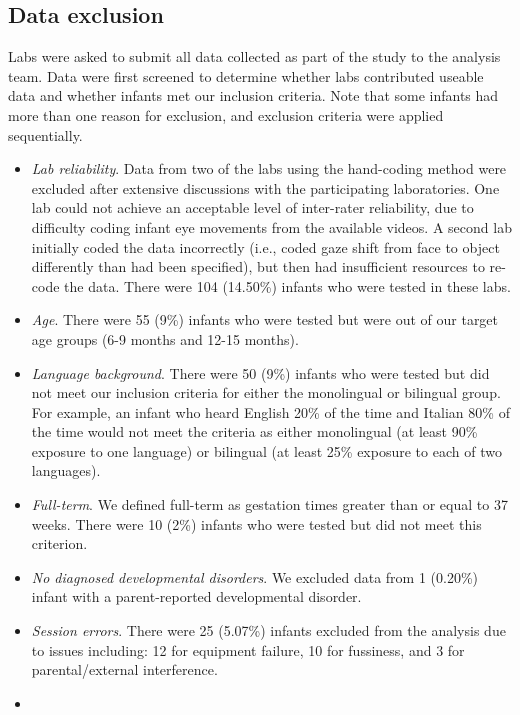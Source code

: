 \documentclass[english,,man,floatsintext]{apa6}
\begin{document}
\hypertarget{data-exclusion}{%
\subsection{Data exclusion}\label{data-exclusion}}

Labs were asked to submit all data collected as part of the study to the analysis team. Data were first screened to determine whether labs contributed useable data and whether infants met our inclusion criteria. Note that some infants had more than one reason for exclusion, and exclusion criteria were applied sequentially.

\begin{itemize}
\item
  \emph{Lab reliability}. Data from two of the labs using the hand-coding method were excluded after extensive discussions with the participating laboratories. One lab could not achieve an acceptable level of inter-rater reliability, due to difficulty coding infant eye movements from the available videos. A second lab initially coded the data incorrectly (i.e., coded gaze shift from face to object differently than had been specified), but then had insufficient resources to re-code the data. There were 104 (14.50\%) infants who were tested in these labs.
\item
  \emph{Age}. There were 55 (9\%) infants who were tested but were out of our target age groups (6-9 months and 12-15 months).
\item
  \emph{Language background}. There were 50 (9\%) infants who were tested but did not meet our inclusion criteria for either the monolingual or bilingual group. For example, an infant who heard English 20\% of the time and Italian 80\% of the time would not meet the criteria as either monolingual (at least 90\% exposure to one language) or bilingual (at least 25\% exposure to each of two languages).
\item
  \emph{Full-term}. We defined full-term as gestation times greater than or equal to 37 weeks. There were 10 (2\%) infants who were tested but did not meet this criterion.
\item
  \emph{No diagnosed developmental disorders}. We excluded data from 1 (0.20\%) infant with a parent-reported developmental disorder.
\item
  \emph{Session errors}. There were 25 (5.07\%) infants excluded from the analysis due to issues including: 12 for equipment failure, 10 for fussiness, and 3 for parental/external interference.
\item

\end{itemize}
\end{document}
